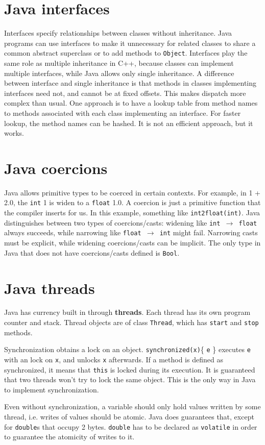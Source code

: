 \section{Java interfaces}
Interfaces specify relationships between classes without inheritance. Java programs can use interfaces to make it unnecessary for related classes to share a common abstract superclass or to add methods to \texttt{Object}. Interfaces play the same role as multiple inheritance in C++, because classes can implement multiple interfaces, while Java allows only single inheritance. A difference between interface and single inheritance is that methods in classes implementing interfaces need not, and cannot be at fixed offsets. This makes dispatch more complex than usual. One approach is to have a lookup table from method names to methods associated with each class implementing an interface. For faster lookup, the method names can be hashed. It is not an efficient approach, but it works. 
\section{Java coercions}
Java allows primitive types to be coerced in certain contexts. For example, in 1 + 2.0, the \texttt{int} 1 is widen to a \texttt{float} 1.0. A coercion is just a primitive function that the compiler inserts for us. In this example, something like \texttt{int2float(int)}. Java distinguishes between two types of coercions/casts: widening like \texttt{int $\rightarrow$ float} always succeeds, while narrowing like \texttt{float $\rightarrow$ int} might fail. Narrowing casts must be explicit, while widening coercions/casts can be implicit. The only type in Java that does not have coercions/casts defined is \texttt{Bool}.
\section{Java threads}
Java has currency built in through \textbf{threads}. Each thread has its own program counter and stack. Thread objects are of class \texttt{Thread}, which has \texttt{start} and \texttt{stop} methods.

Synchronization obtains a lock on an object. \texttt{synchronized(x)}\{ \texttt{e} \} executes \texttt{e} with an lock on \texttt{x}, and unlocks \texttt{x} afterwards. If a method is defined as synchronized, it means that \texttt{this} is locked during its execution. It is guaranteed that two threads won't try to lock the same object. This is the only way in Java to implement synchronization. 

Even without synchronization, a variable should only hold values written by some thread, i.e. writes of values should be atomic. Java does guarantees that, except for \texttt{double}s that occupy 2 bytes. \texttt{double} has to be declared as \texttt{volatile} in order to guarantee the atomicity of writes to it. 
\ifx\PREAMBLE\undefined

\fi